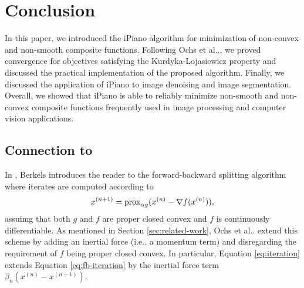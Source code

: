 \documentclass[onecolumn,final,a4paper,13pt,reqno]{siamart}
\makeatletter
\newcommand{\rpm}{\raisebox{.2ex}{$\scriptstyle\pm$}}
\DeclareRobustCommand\onedot{\futurelet\@let@token\@onedot}
\def\@onedot{\ifx\@let@token.\else.\null\fi\xspace}
\def\ie{{i.e}\onedot} \def\Ie{{I.e}\onedot}
\def\etal{{et al}\onedot}
\DeclareRobustCommand{\prox}[1]{%
    \ifmmode
        \text{prox}_{#1}
    \else
        $\text{prox}_{#1}$
    \fi
}
\makeatother
\begin{document}


\section{Conclusion}
\label{sec:conclusion}

In this paper, we introduced the iPiano algorithm for minimization of non-convex and non-smooth composite functions. Following Ochs \etal \cite{OchsChenBroxPock:2013}, we proved convergence for objectives satisfying the Kurdyka-Lojasiewicz property \cite{Lojasiewicz:1993,Kurdyka:1998} and discussed the practical implementation of the proposed algorithm. Finally, we discussed the application of iPiano to image denoising and image segmentation. Overall, we showed that iPiano is able to reliably minimize non-smooth and non-convex composite functions frequently used in image processing and computer vision applications.

\subsection{Connection to \cite{Berkels:2015}}

In \cite[Bem. 4.12]{Berkels:2015}, Berkels introduces the reader to the forward-backward splitting algorithm where iterates are computed according to
\begin{align}
	x^{(n + 1)} = \prox{\alpha g}(x^{(n)} - \nabla f(x^{(n)})),\label{eq:fb-iteration}
\end{align}
assuimg that both $g$ and $f$ are proper closed convex and $f$ is continuously differentiable. As mentioned in Section \ref{sec:related-work}, Ochs \etal extend this scheme by adding an inertial force (\ie a momentum term) and disregarding the requirement of $f$ being proper closed convex. In particular, Equation \eqref{eq:iteration} extends Equation \eqref{eq:fb-iteration} by the inertial force term $\beta_n(x^{(n)} - x^{(n - 1)})$.



\end{document}
